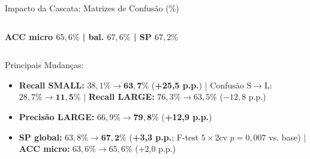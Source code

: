 \documentclass[aspectratio=169]{beamer}
\begin{document}
\begin{frame}{Impacto da Cascata: Matrizes de Confus\~{a}o (\%)}
\begin{columns}[T]
        \scriptsize
        \textbf{ACC micro $65,6\%$ | bal. $67,6\%$ | SP $67,2\%$}
    \end{columns}

    \vspace{0.15cm}
    \begin{block}{\small Principais Mudan\c{c}as:}
        \scriptsize
        \begin{itemize}
            \setlength{\itemsep}{1pt}
            \item \textbf{Recall SMALL:} $38,1\% \to \mathbf{63,7\%}$ (\textbf{+25,5 p.p.}) | Confus\~{a}o S$\to$L: $28,7\% \to \mathbf{11,5\%}$ | \textbf{Recall LARGE:} $76,3\% \to 63,5\%$ ($-12,8$ p.p.)
            \item \textbf{Precis\~{a}o LARGE:} $66,9\% \to \mathbf{79,8\%}$ (\textbf{+12,9 p.p.})
            \item \textbf{SP global:} $63,8\% \to \mathbf{67,2\%}$ (\textbf{+3,3 p.p.}; F-test $5\times2$cv $p=0,007$ vs. base) | \textbf{ACC micro:} $63,6\% \to 65,6\%$ (+2,0 p.p.)
        \end{itemize}
    \end{block}
\end{frame}
\end{document}
